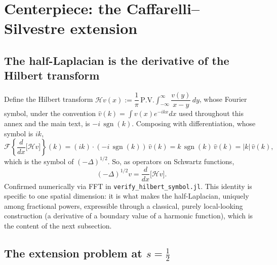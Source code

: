 \documentclass{article}
\DeclareMathOperator{\sgn}{sgn}
\newcommand{\HT}{\mathcal{H}}
\begin{document}
\section{Centerpiece: the Caffarelli--Silvestre extension}
\label{sec:extension}

\subsection{The half-Laplacian is the derivative of the Hilbert transform}
\label{sec:hilbertsymbol}

Define the Hilbert transform $\HT v(x) := \dfrac{1}{\pi}\,\mathrm{P.V.}\displaystyle\int_{-\infty}^\infty \dfrac{v(y)}{x-y}\,dy$,
whose Fourier symbol, under the convention $\hat v(k)=\int v(x)e^{-ikx}dx$
used throughout this annex and the main text, is $-i\,\sgn(k)$. Composing
with differentiation, whose symbol is $ik$,
\begin{equation}
\mathcal{F}\!\left\{\frac{d}{dx}\big[\HT v\big]\right\}(k)
= (ik)\cdot(-i\,\sgn(k))\,\hat v(k)
= k\,\sgn(k)\,\hat v(k) = |k|\,\hat v(k),
\end{equation}
which is the symbol of $(-\Delta)^{1/2}$. So, as operators on
Schwartz functions,
\begin{equation}
(-\Delta)^{1/2}v = \frac{d}{dx}\big[\HT v\big].
\label{frac:hilbert-symbol}
\end{equation}
Confirmed numerically via FFT in \texttt{verify\_hilbert\_symbol.jl}. This
identity is specific to one spatial dimension: it is what makes the
half-Laplacian, uniquely among fractional powers, expressible through a
classical, purely local-looking construction (a derivative of a boundary
value of a harmonic function), which is the content of the next subsection.

\subsection{The extension problem at $s=\tfrac12$}
\end{document}
